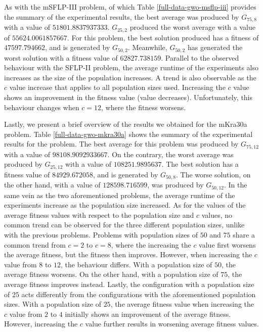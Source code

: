 As with the mSFLP-III problem, of which Table \ref{full-data-gwo-msflp-iii} provides the summary of the experimental results, the best average was produced by $G_{75,8}$ with a value of $51801.8837937333$. $G_{25,2}$ produced the worst average with a value of $55624.0061857667$. For this problem, the best solution produced has a fitness of $47597.794662$, and is generated by $G_{50,2}$. Meanwhile, $G_{50,2}$ has generated the worst solution with a fitness value of $62827.738159$. Parallel to the observed behaviour with the SFLP-II problem, the average runtime of the experiments also increases as the size of the population increases. A trend is also observable as the $c$ value increase that applies to all population sizes used. Increasing the $c$ value shows an improvement in the fitness value (value decreases). Unfortunately, this behaviour changes when $c = 12$, where the fitness worsens.

Lastly, we present a brief overview of the results we obtained for the mKra30a problem. Table \ref{full-data-gwo-mkra30a} shows the summary of the experimental results for the problem. The best average for this problem was produced by $G_{75,12}$ with a value of $98108.9092933667$. On the contrary, the worst average was produced by $G_{25,12}$ with a value of $108251.9895637$. The best solution has a fitness value of $84929.672058$, and is generated by $G_{50,8}$. The worse solution, on the other hand, with a value of $128598.716599$, was produced by $G_{50,12}$. In the same vein as the two aforementioned problems, the average runtime of the experiments increase as the population size increased. As for the values of the average fitness values with respect to the population size and $c$ values, no common trend can be observed for the three different population sizes, unlike with the previous problems. Problems with population sizes of $50$ and $75$ share a common trend from $c = 2$ to $c = 8$, where the increasing the $c$ value first worsens the average fitness, but the fitness then improves. However, when increasing the $c$ value from $8$ to $12$, the behaviour differs. With a population size of $50$, the average fitness worsens. On the other hand, with a population size of $75$, the average fitness improves instead. Lastly, the configuration with a population size of $25$ acts differently from the configurations with the aforementioned population sizes. With a population size of $25$, the average fitness value when increasing the $c$ value from $2$ to $4$ initially shows an improvement of the average fitness. However, increasing the $c$ value further results in worsening average fitness values.

